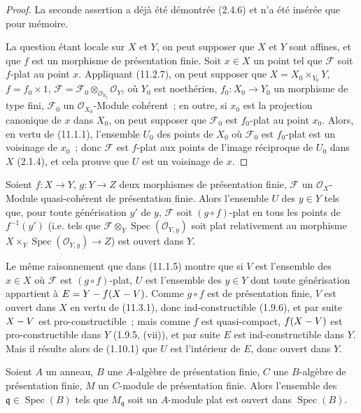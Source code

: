 \begin{proof}
La seconde assertion a déjà été démontrée (2.4.6) et n'a été insérée que pour
mémoire.

La question étant locale sur $X$ et $Y$, on peut supposer que $X$ et $Y$ sont
affines, et que $f$ est un morphisme de présentation finie. Soit $x\in X$ un
point tel que $\mathcal F$ soit $f$-plat au point $x$. Appliquant (11.2.7), on
peut supposer que
$X=X_0\times_{Y_0}Y$, $f=f_0\times1$,
$\mathcal F=\mathcal F_0\otimes_{\mathcal O_{Y_0}}\mathcal O_Y$,
où $Y_0$ est noethérien, $f_0:X_0\to Y_0$ un morphisme de type fini,
$\mathcal F_0$ un $\mathcal O_{X_0}$-Module cohérent~; en outre, si $x_0$ est la
projection canonique de $x$ dans $X_0$, on peut supposer que $\mathcal F_0$ est
$f_0$-plat au point $x_0$. Alors, en vertu de (11.1.1), l'ensemble $U_0$ des
points de $X_0$ où $\mathcal F_0$ est $f_0$-plat est un voisinage de $x_0$~;
donc $\mathcal F$ est $f$-plat aux points de l'image réciproque de $U_0$ dans
$X$ (2.1.4), et cela prouve que $U$ est un voisinage de $x$.
\end{proof}


\begin{corollary}[11.3.2]
\label{IV.11.3.2-fr}
Soient $f:X\to Y$, $g:Y\to Z$ deux morphismes de présentation finie,
$\mathcal F$ un $\mathcal O_X$-Module quasi-cohérent de présentation finie.
Alors l'ensemble $U$ des $y\in Y$ tels que, pour toute générisation $y'$ de
$y$, $\mathcal F$ soit $(g\circ f)$-plat en tous les points de $f^{-1}(y')$
\textup{(i.e.} tels que $\mathcal F\otimes_Y\operatorname{Spec}(\mathcal O_{Y,y})$
soit plat relativement au morphisme
$X\times_Y\operatorname{Spec}(\mathcal O_{Y,y})\to Z$\textup{)} est ouvert dans $Y$.
\end{corollary}

Le même raisonnement que dans (11.1.5) montre que si $V$ est l'ensemble des
$x\in X$ où $\mathcal F$ est $(g\circ f)$-plat, $U$ est l'ensemble des $y\in Y$
dont toute générisation appartient à $E=Y- f(X- V)$. Comme $g\circ f$ est de
présentation finie, $V$ est ouvert dans $X$ en vertu de (11.3.1), donc
ind-constructible (1.9.6), et par suite $X- V$ est pro-constructible~; mais comme
$f$ est quasi-compact, $f(X- V)$ est pro-constructible dans $Y$ (1.9.5, (vii)),
et par suite $E$ est ind-constructible dans $Y$. Mais il résulte alors de
(1.10.1) que $U$ est l'intérieur de $E$, donc ouvert dans $Y$.

\begin{corollary}[11.3.3]
\label{IV.11.3.3-fr}
Soient $A$ un anneau, $B$ une $A$-algèbre de présentation finie, $C$ une
$B$-algèbre de présentation finie, $M$ un $C$-module de présentation finie.
Alors l'ensemble des $\mathfrak q\in\operatorname{Spec}(B)$ tels que
$M_\mathfrak q$ soit un $A$-module plat est ouvert dans
$\operatorname{Spec}(B)$.
\end{corollary}

